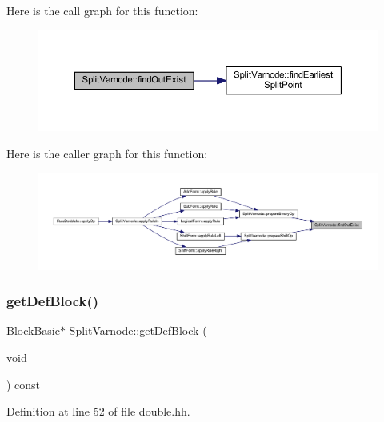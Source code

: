 Here is the call graph for this function\+:
\nopagebreak
\begin{figure}[H]
\begin{center}
\leavevmode
\includegraphics[width=350pt]{class_split_varnode_a19a8c2ae5257a563a5a0e7d3ccd7704e_cgraph}
\end{center}
\end{figure}
Here is the caller graph for this function\+:
\nopagebreak
\begin{figure}[H]
\begin{center}
\leavevmode
\includegraphics[width=350pt]{class_split_varnode_a19a8c2ae5257a563a5a0e7d3ccd7704e_icgraph}
\end{center}
\end{figure}
\mbox{\label{class_split_varnode_ad8924f8b19d9c23932ffbee502edc8aa}} 
\subsubsection{\texorpdfstring{getDefBlock()}{getDefBlock()}}
{\footnotesize\ttfamily \mbox{\hyperlink{class_block_basic}{Block\+Basic}}$\ast$ Split\+Varnode\+::get\+Def\+Block (\begin{DoxyParamCaption}\item[{void}]{ }\end{DoxyParamCaption}) const\hspace{0.3cm}{\ttfamily [inline]}}



Definition at line 52 of file double.\+hh.

\mbox{\label{class_split_varnode_a41170d0dab7ac87fd947d3585ed7e896}} 
